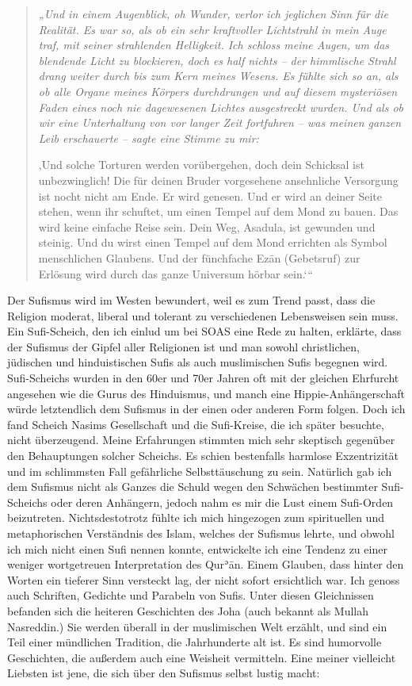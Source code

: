 \documentclass[12pt]{memoir}
\def\´{ʾ} %
\def \Quran{Qur\-\´ān} %
\def\–{\hskip0pt-\hskip0pt}
\begin{document}
\begin{quote}
\itshape
„Und in einem Augenblick, oh Wunder,
verlor ich jeglichen Sinn für die Realität.
Es war so, als ob ein sehr kraftvoller Lichtstrahl in mein Auge traf,
mit seiner strahlenden Helligkeit.
Ich schloss meine Augen, um das blendende Licht zu blockieren,
doch es half nichts –
der himmlische Strahl drang weiter durch bis zum Kern meines Wesens.
Es fühlte sich so an, als ob alle Organe meines Körpers durchdrungen
und auf diesem mysteriösen Faden eines noch nie dagewesenen Lichtes
ausgestreckt wurden.
Und als ob wir eine Unterhaltung von vor langer Zeit fortfuhren –
was meinen ganzen Leib erschauerte –
sagte eine Stimme zu mir:

‚Und solche Torturen werden vorübergehen,
doch dein Schicksal ist unbezwinglich!
Die für deinen Bruder vorgesehene ansehnliche Versorgung
ist nocht nicht am Ende.
Er wird genesen.
Und er wird an deiner Seite stehen, wenn ihr schuftet,
um einen Tempel auf dem Mond zu bauen.
Das wird keine einfache Reise sein.
Dein Weg, Asadula, ist gewunden und steinig.
Und du wirst einen Tempel auf dem Mond errichten
als Symbol menschlichen Glaubens.
Und der fünchfache Ezān (Gebetsruf) zur Erlösung
wird durch das ganze Universum hörbar sein.‘“
\end{quote}

Der Sufismus wird im Westen bewundert, weil es zum Trend passt,
dass die Religion moderat, liberal
und tolerant zu verschiedenen Lebensweisen sein muss.
Ein Sufi-Scheich, den ich einlud um bei SOAS eine Rede zu halten,
erklärte, dass der Sufismus der Gipfel aller Religionen ist
und man sowohl christlichen, jüdischen und hinduistischen Sufis
als auch muslimischen Sufis begegnen wird.
Sufi-Scheichs wurden in den 60er und 70er Jahren
oft mit der gleichen Ehrfurcht angesehen wie die Gurus des Hinduismus,
und manch eine Hippie-Anhängerschaft würde letztendlich dem Sufismus
in der einen oder anderen Form folgen.
Doch ich fand Scheich Nasims Gesellschaft
und die Sufi\–Kreise, die ich später besuchte, nicht überzeugend.
Meine Erfahrungen stimmten mich sehr skeptisch
gegenüber den Behauptungen solcher Scheichs.
Es schien bestenfalls harmlose Exzentrizität
und im schlimmsten Fall gefährliche Selbsttäuschung zu sein.
Natürlich gab ich dem Sufismus nicht als Ganzes die Schuld
wegen den Schwächen bestimmter Sufi-Scheichs oder deren Anhängern,
jedoch nahm es mir die Lust einem Sufi\–Orden beizutreten.
Nichtsdestotrotz fühlte ich mich hingezogen
zum spirituellen und metaphorischen Verständnis des Islam,
welches der Sufismus lehrte,
und obwohl ich mich nicht einen Sufi nennen konnte,
entwickelte ich eine Tendenz
zu einer weniger wortgetreuen Interpretation des \Quran.
Einem Glauben, dass hinter den Worten ein tieferer Sinn versteckt lag,
der nicht sofort ersichtlich war.
Ich genoss auch Schriften, Gedichte und Parabeln von Sufis.
Unter diesen Gleichnissen befanden sich die heiteren Geschichten des Joha
(auch bekannt als Mullah Nasreddin.)
Sie werden überall in der muslimischen Welt erzählt,
und sind ein Teil einer mündlichen Tradition, die Jahrhunderte alt ist.
Es sind humorvolle Geschichten, die außerdem auch eine Weisheit vermitteln.
Eine meiner vielleicht Liebsten ist jene,
die sich über den Sufismus selbst lustig macht:
\end{document}
